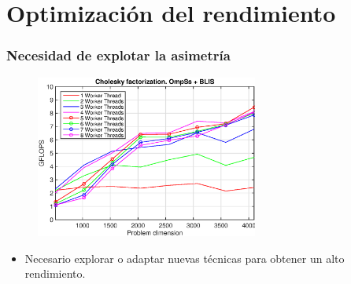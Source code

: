 \documentclass[10pt]{beamer}
\begin{document}
\section{Optimización del rendimiento}
\begin{frame}
  \frametitle{Necesidad de explotar la asimetría}
  \begin{figure}\centering
    \includegraphics[width=0.65\textwidth]{Plots/Orig_runtime/plot_1to8_th.eps}
  \end{figure}

  \begin{itemize}
  \item Necesario explorar o adaptar nuevas técnicas para obtener un alto
    rendimiento.
  \end{itemize}
\end{frame}
\end{document}
